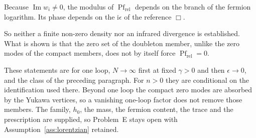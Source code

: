 Because \(\operatorname{Im}w_i\neq0\), the modulus of \(\operatorname{Pf}_{\mathrm{rel}}\) depends on the branch of the fermion logarithm. Its phase depends on the \(\mathrm i\epsilon\) of the reference \(\Box\).

So neither a finite non-zero density nor an infrared divergence is established. What is shown is that the zero set of the doubleton member, unlike the zero modes of the compact members, does not by itself force \(\operatorname{Pf}_{\mathrm{rel}}=0\).

These statements are for one loop, \(N\to\infty\) first at fixed \(\gamma>0\) and then \(\epsilon\to0\), and the class of the preceding paragraph. For \(n>0\) they are conditional on the identification used there. Beyond one loop the compact zero modes are absorbed by the Yukawa vertices, so a vanishing one-loop factor does not remove those members. The family, \(h_0\), the mass, the fermion content, the trace and the prescription are supplied, so Problem~E stays open with Assumption~\ref{ass:lorentzian} retained.

